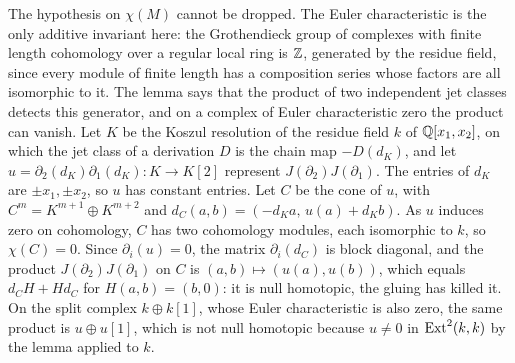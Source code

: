 The hypothesis on $\chi(M)$ cannot be dropped. The Euler characteristic is
the only additive invariant here: the Grothendieck group of complexes with
finite length cohomology over a regular local ring is $\mathbb{Z}$, generated by the
residue field, since every module of finite length has a composition series
whose factors are all isomorphic to it. The lemma says that the product of two
independent jet classes detects this generator, and on a complex of Euler
characteristic zero the product can vanish. Let $K$ be the Koszul resolution
of the residue field $k$ of $\mathbb{Q}[x_{1},x_{2}]$, on which the jet class of a
derivation $D$ is the chain map $-D(d_{K})$, and let $u=\partial_{2}(d_{K})
\partial_{1}(d_{K})\colon K\to K[2]$ represent $J(\partial_{2})J(\partial_{1})$.
The entries of $d_{K}$ are $\pm x_{1},\pm x_{2}$, so $u$ has constant
entries. Let $C$ be the cone of $u$, with $C^{m}=K^{m+1}\oplus K^{m+2}$ and
$d_{C}(a,b)=(-d_{K}a,\,u(a)+d_{K}b)$. As $u$ induces zero on cohomology, $C$ has
two cohomology modules, each isomorphic to $k$, so $\chi(C)=0$. Since
$\partial_{i}(u)=0$, the matrix $\partial_{i}(d_{C})$ is block diagonal, and the
product $J(\partial_{2})J(\partial_{1})$ on $C$ is $(a,b)\mapsto(u(a),u(b))$,
which equals $d_{C}H+Hd_{C}$ for $H(a,b)=(b,0)$: it is null homotopic, the
gluing has killed it. On the split complex $k\oplus k[1]$, whose Euler
characteristic is also zero, the same product is $u\oplus u[1]$, which is not
null homotopic because $u\ne0$ in $\operatorname{Ext}^{2}(k,k)$ by the lemma applied to $k$.


